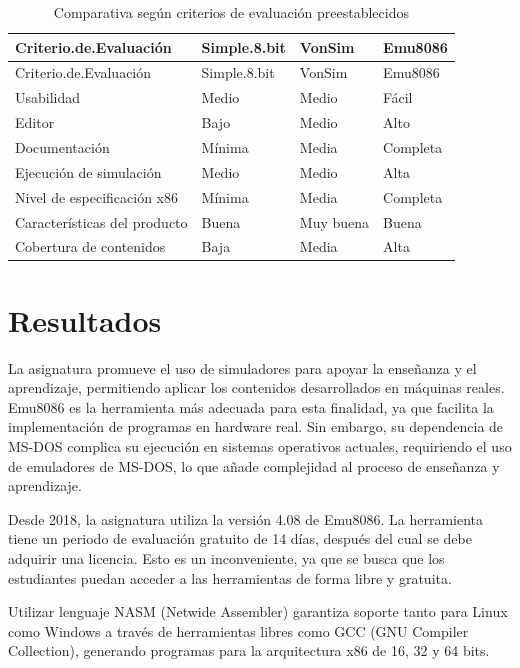 \documentclass[12pt,oneside]{templates/unerthesis}
\begin{document}
\begin{longtable}[]{@{}llll@{}}
\caption{\label{tab:tabla-comparativa-criterios}Comparativa según criterios de evaluación preestablecidos}\tabularnewline
\toprule\noalign{}
Criterio.de.Evaluación & Simple.8.bit & VonSim & Emu8086 \\
\midrule\noalign{}
\endfirsthead
\toprule\noalign{}
Criterio.de.Evaluación & Simple.8.bit & VonSim & Emu8086 \\
\midrule\noalign{}
\endhead
\bottomrule\noalign{}
\endlastfoot
Usabilidad & Medio & Medio & Fácil \\
Editor & Bajo & Medio & Alto \\
Documentación & Mínima & Media & Completa \\
Ejecución de simulación & Medio & Medio & Alta \\
Nivel de especificación x86 & Mínima & Media & Completa \\
Características del producto & Buena & Muy buena & Buena \\
Cobertura de contenidos & Baja & Media & Alta \\
\end{longtable}

\hypertarget{resultados}{%
\section{Resultados}\label{resultados}}

La asignatura promueve el uso de simuladores para apoyar la enseñanza y el aprendizaje, permitiendo aplicar los contenidos desarrollados en máquinas reales. Emu8086 es la herramienta más adecuada para esta finalidad, ya que facilita la implementación de programas en hardware real. Sin embargo, su dependencia de MS-DOS complica su ejecución en sistemas operativos actuales, requiriendo el uso de emuladores de MS-DOS, lo que añade complejidad al proceso de enseñanza y aprendizaje.

Desde 2018, la asignatura utiliza la versión 4.08 de Emu8086. La herramienta tiene un periodo de evaluación gratuito de 14 días, después del cual se debe adquirir una licencia. Esto es un inconveniente, ya que se busca que los estudiantes puedan acceder a las herramientas de forma libre y gratuita.

Utilizar lenguaje NASM (Netwide Assembler) garantiza soporte tanto para Linux como Windows a través de herramientas libres como GCC (GNU Compiler Collection), generando programas para la arquitectura x86 de 16, 32 y 64 bits.
\end{document}
